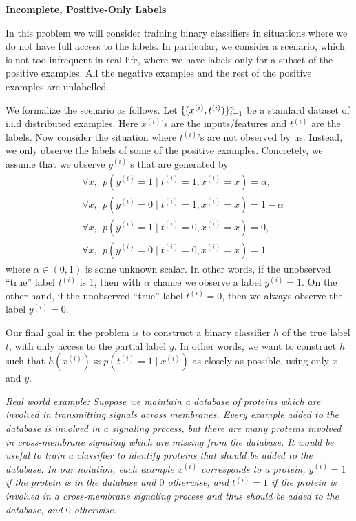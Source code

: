 \item {} {\bf Incomplete, Positive-Only Labels}

In this problem we will consider training binary classifiers in situations
where we do not have full access to the labels. In particular, we consider
a scenario, which is not too infrequent in real life, where we have labels
only for a subset of the positive examples. All the negative examples and
the rest of the positive examples are unlabelled.

We formalize the scenario as follows. Let $\{(x^{(i)}, t^{(i)})\}_{i=1}^{n}$ be a standard dataset of i.i.d distributed examples. Here $x^{(i)}$'s are the inputs/features and $t^{(i)}$ are the labels. Now consider the situation where $t^{(i)}$'s are not observed by us. Instead, we only observe the labels of some of the positive examples. Concretely, we assume that we observe  $y^{(i)}$'s that are generated by
\begin{align*}
& \forall  x, ~~ p(y^{(i)} = 1\mid t^{(i)}=1, x^{(i)}=x) = \alpha, \\
& \forall  x, ~~ p(y^{(i)} = 0 \mid t^{(i)}=1, x^{(i)}=x)  = 1- \alpha\\
& \forall  x, ~~ p(y^{(i)} = 1 \mid t^{(i)}=0, x^{(i)}=x) = 0,\\ 
& \forall  x, ~~ p(y^{(i)} = 0 \mid t^{(i)}=0, x^{(i)}=x) = 1
\end{align*}
where $\alpha \in (0,1)$ is some unknown scalar. In other words, if the unobserved ``true'' label $t^{(i)}$ is 1, then with $\alpha$ chance we observe a label $y^{(i)} = 1$. On the other hand, if the unobserved ``true'' label $t^{(i)} = 0$, then we always observe the label $y^{(i)} = 0$. 

Our final goal in the problem is to construct a binary classifier $h$ of
the true label $t$, with only access to the partial label $y$. In other words,
we want to construct $h$ such that
 $h(x^{(i)}) \approx p(t^{(i)} = 1\mid x^{(i)})$ as closely as
possible, using only $x$ and $y$.

\emph{Real world example: Suppose we maintain a database of proteins which
are involved in transmitting signals across membranes. Every example added to
the database is involved in a signaling process, but there are many proteins
involved in cross-membrane signaling which are missing from the database.
It would be useful to train a classifier to identify proteins that
should be added to the database. In our notation, each example $x^{(i)}$
corresponds to a protein, $y^{(i)} = 1$ if the protein is in the database and
$0$ otherwise, and $t^{(i)} = 1$ if the protein is involved in a cross-membrane
signaling process and thus should be added to the database, and $0$ otherwise.}


